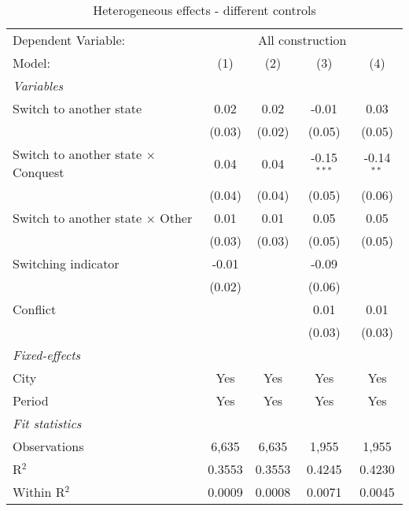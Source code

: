 \begin{table}[htbp]
   \caption{\label{tab:controls_50y} Heterogeneous effects - different controls}
   \centering
   \begin{tabular}{lcccc}
      \tabularnewline \midrule \midrule
      Dependent Variable: & \multicolumn{4}{c}{All construction}\\
      Model:                                     & (1)    & (2)    & (3)           & (4)\\  
      \midrule
      \emph{Variables}\\
      Switch to another state                    & 0.02   & 0.02   & -0.01         & 0.03\\   
                                                 & (0.03) & (0.02) & (0.05)        & (0.05)\\   
      Switch to another state $\times$ Conquest  & 0.04   & 0.04   & -0.15$^{***}$ & -0.14$^{**}$\\   
                                                 & (0.04) & (0.04) & (0.05)        & (0.06)\\   
      Switch to another state $\times$ Other     & 0.01   & 0.01   & 0.05          & 0.05\\   
                                                 & (0.03) & (0.03) & (0.05)        & (0.05)\\   
      Switching indicator                        & -0.01  &        & -0.09         &   \\   
                                                 & (0.02) &        & (0.06)        &   \\   
      Conflict                                   &        &        & 0.01          & 0.01\\   
                                                 &        &        & (0.03)        & (0.03)\\   
      \midrule
      \emph{Fixed-effects}\\
      City                                       & Yes    & Yes    & Yes           & Yes\\  
      Period                                     & Yes    & Yes    & Yes           & Yes\\  
      \midrule
      \emph{Fit statistics}\\
      Observations                               & 6,635  & 6,635  & 1,955         & 1,955\\  
      R$^2$                                      & 0.3553 & 0.3553 & 0.4245        & 0.4230\\  
      Within R$^2$                               & 0.0009 & 0.0008 & 0.0071        & 0.0045\\  
      \midrule \midrule
      

\end{tabular}
\end{table}
